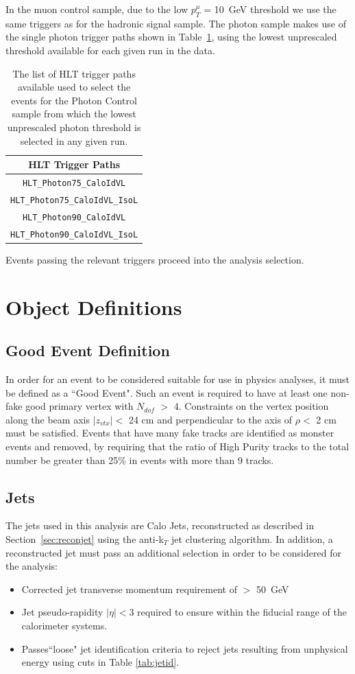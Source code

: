 In the muon control sample, due to the low $p^{\mu}_{T}$ = 10~GeV threshold we use the same triggers as for the hadronic signal sample. The photon sample makes use of the single photon trigger paths shown in Table~\ref{tab:photrig}, using the lowest unprescaled threshold available for each given run in the data.
\begin{table}[htbp]
\centering
\begin{tabular}{ c }
\hline
\hline
HLT Trigger Paths\\
\hline
\hline
\verb!HLT_Photon75_CaloIdVL!\\
\verb!HLT_Photon75_CaloIdVL_IsoL!\\
\verb!HLT_Photon90_CaloIdVL!\\
\verb!HLT_Photon90_CaloIdVL_IsoL!\\
\hline
\end{tabular}
\caption{\label{tab:photrig}The list of HLT trigger paths available used to select the events for the Photon Control sample from which the lowest unprescaled photon threshold is selected in any given run.}
\end{table}


Events passing the relevant triggers proceed into the analysis selection.

\section{Object Definitions}
\subsection{Good Event Definition}
\label{sec:good}
In order for an event to be considered suitable for use in physics analyses, it must be defined as a ``Good Event". Such an event is required to have at least one non-fake good primary vertex with $N_{dof}$ $>$ 4. Constraints on the vertex position along the beam axis $|z_{vtx}| <$ 24 cm and perpendicular to the axis of $\rho <$ 2 cm must be satisfied. Events that have many fake tracks are identified as monster events and removed, by requiring that the ratio of High Purity tracks to the total number be greater than 25\% in events with more than 9 tracks.


\subsection{Jets}
\label{sec:jetsel}
The jets used in this analysis are Calo Jets, reconstructed as described in Section~\ref{sec:reconjet} using the anti-k$_{T}$ jet clustering algorithm. In addition, a reconstructed jet must pass an additional selection in order to be considered for the analysis:
\begin{itemize}
\item Corrected jet transverse momentum requirement of \Pt $>$ 50~GeV
\item Jet pseudo-rapidity $|\eta| < 3$ required to ensure within the fiducial range of the calorimeter systems.
\item Passes``loose" jet identification criteria to reject jets resulting from unphysical energy using cuts in Table \ref{tab:jetid}.
\end{itemize}

